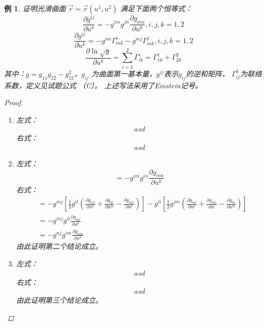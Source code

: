 \documentclass{article}                     %
\numberwithin{equation}{section}            %
\numberwithin{figure}{section}              %
\numberwithin{table}{section}               %
\newtheorem{example}{\indent 例}[section]
\begin{document}
\begin{example}
    证明光滑曲面 $\vec{r}=\vec{r}(u^1,u^2)$ 满足下面两个恒等式：
    $$\frac{\partial g^{ij}}{\partial u^k}=-g^{im}g^{jn}\frac{\partial g_{mn}}{\partial u^k} ,i,j,k=1,2 $$
    $$\frac{\partial g^{ij}}{\partial u^k}=-g^{mi}\Gamma_{mk}^i -g^{mj}\Gamma _{mk}^j,i,j,k=1,2$$
    $$\frac{\partial \ln{\sqrt{g}}}{\partial u^k}=\sum_{i=1}^{2}\Gamma _{ik}^i=\Gamma _{1k}^1+\Gamma _{2k}^2$$
    其中：$g=g_{11}g_{22}-g_{12}^2$，$g_{ij}$ 为曲面第一基本量，$g^{ij}$表示$g_{ij}$的逆和矩阵， $\Gamma _{ij}^k$为联络系数，定义见试题公式 （C）。 上述写法采用了Einstein记号。
    \begin{proof}
        \begin{enumerate}
            \item 左式：
            \begin{equation*}
                \begin{aligned}
                    asd
                \end{aligned}
            \end{equation*}
            右式：
            \begin{equation*}
                \begin{aligned}
                    asd
                \end{aligned}
            \end{equation*}
            \item 左式：
            $$=-g^{im}g^{in}\frac{\partial g_{mn}}{\partial u^{k}}$$
            右式：
            \begin{equation*}
                \begin{aligned}
                    &=-g^{mj}[\frac{1}{2}g^{il}(\frac{\partial g_{ml}}{\partial u^k}+\frac{\partial g_{kl}}{\partial u^m}-\frac{\partial g_{mk}}{\partial u^l})]-g^{li}[\frac{1}{2}g^{jm}(\frac{\partial g_{ml}}{\partial u^k}+\frac{\partial g_{km}}{\partial u^l}-\frac{\partial g_{lk}}{\partial u^m})]\\
                    &=-g^{mj}g^{il}\frac{\partial g_{ml}}{\partial u^k}\\
                    &=-g^{nj}g^{im}\frac{\partial g_{nm}}{\partial u^k}
                \end{aligned}
            \end{equation*}
            由此证明第二个结论成立。
            \item 左式：
            \begin{equation*}
                \begin{aligned}
                    asd
                \end{aligned}
            \end{equation*}
            右式：
            \begin{equation*}
                \begin{aligned}
                    asd
                \end{aligned}
            \end{equation*}
            由此证明第三个结论成立。
        \end{enumerate}
    \end{proof}
\end{example}
\end{document}
